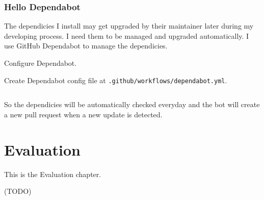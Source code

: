 \documentclass[a4paper]{report}
\begin{document}
\subsection{Hello Dependabot}

The dependicies I install may get upgraded by their maintainer later during my developing process. I need them to be managed and upgraded automatically. I use GitHub Dependabot to manage the dependicies.

Configure Dependabot.

Create Dependabot config file at \texttt{.github/workflows/dependabot.yml}.

\inputminted{yaml}{../.github/dependabot.yml}

So the dependicies will be automatically checked everyday and the bot will create a new pull request when a new update is detected.

\chapter{Evaluation}

This is the Evaluation chapter.

(TODO)
\end{document}
